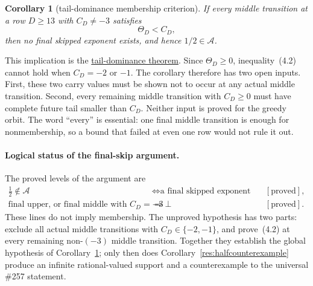 \documentclass[11pt]{article}
\newcommand{\commit}{ebc98ee71f6819bd9fe344a0bb343542c604e533}
\newcommand{\repobase}{https://github.com/wcook04/plectis-lean-erdos249-257/blob/\commit}
\newcommand{\PK}{Erdos249257}
\newcommand{\lword}[4]{\href{\repobase/\PK/#1\#L#2}{#4}}
\newtheorem{corollary}[theorem]{Corollary}
\theoremstyle{definition}
\theoremstyle{remark}
\begin{document}
\begin{corollary}[tail-dominance membership criterion]\label{res:taildominance}
If every middle transition at a row \(D\geq13\) with \(C_D\neq-3\) satisfies
\[
 \Theta_D<C_D, \tag{4.2}
\]
then no final skipped exponent exists, and hence \(1/2\in\mathcal A\).
\end{corollary}
\noindent This implication is the
\lword{HalfCylinderLastProducerContradiction.lean}{387}{half_mem_mersenneAchievementSet_of_middleProducerTailEscapeExceptNegThree}{tail-dominance theorem}.
Since \(\Theta_D\geq0\), inequality~\textup{(4.2)} cannot hold when
\(C_D=-2\) or \(-1\).  The corollary therefore has two open inputs.  First,
these two carry values must be shown not to occur at any actual middle
transition.  Second, every remaining middle transition with \(C_D\geq0\)
must have complete future tail smaller than \(C_D\).  Neither input is proved
for the greedy orbit.  The word ``every'' is essential: one final middle
transition is enough for nonmembership, so a bound that failed at even one
row would not rule it out.

\paragraph{Logical status of the final-skip argument.}
The proved levels of the argument are
{\small\setlength{\arraycolsep}{3pt}
\[
\begin{array}{rcl}
 \frac12\notin\mathcal A
 &\Leftrightarrow
   \text{a final skipped exponent exists}
 &[\text{proved}],\\
 \text{final upper, or final middle with }C_D=-3
 &\Rightarrow\bot
 &[\text{proved}].
\end{array}
\]
}
These lines do not imply membership.  The unproved hypothesis has two parts:
exclude all actual middle transitions with \(C_D\in\{-2,-1\}\), and
prove~\textup{(4.2)} at every remaining non-\((-3)\) middle transition.
Together they establish the global hypothesis of
Corollary~\ref{res:taildominance}; only then does
Corollary~\ref{res:halfcounterexample} produce an infinite rational-valued
support and a counterexample to the universal \#257 statement.
\end{document}

